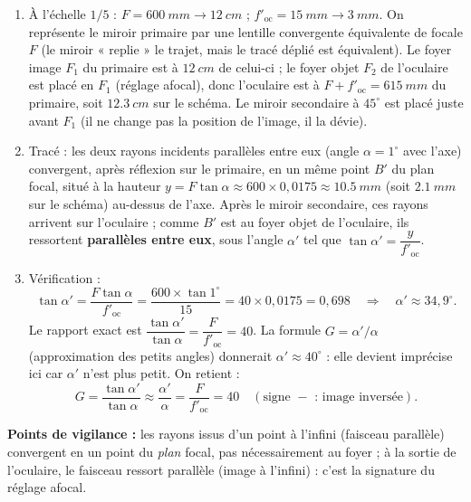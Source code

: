 \documentclass[11pt]{article}
\begin{document}
\begin{corrige}
\begin{enumerate}
    \item À l'échelle $1/5$ : $F = \SI{600}{mm} \rightarrow \SI{12}{cm}$ ; $f'_{\text{oc}} = \SI{15}{mm} \rightarrow \SI{3}{mm}$. On représente le miroir primaire par une lentille convergente équivalente de focale $F$ (le miroir « replie » le trajet, mais le tracé déplié est équivalent). Le foyer image $F_1$ du primaire est à $\SI{12}{cm}$ de celui-ci ; le foyer objet $F_2$ de l'oculaire est placé en $F_1$ (réglage afocal), donc l'oculaire est à $F + f'_{\text{oc}} = \SI{615}{mm}$ du primaire, soit $\SI{12,3}{cm}$ sur le schéma. Le miroir secondaire à $45^\circ$ est placé juste avant $F_1$ (il ne change pas la position de l'image, il la dévie).
    \item Tracé : les deux rayons incidents parallèles entre eux (angle $\alpha = 1^\circ$ avec l'axe) convergent, après réflexion sur le primaire, en un même point $B'$ du plan focal, situé à la hauteur $y = F\tan\alpha \approx 600 \times 0,0175 \approx \SI{10,5}{mm}$ (soit $\SI{2,1}{mm}$ sur le schéma) au-dessus de l'axe. Après le miroir secondaire, ces rayons arrivent sur l'oculaire ; comme $B'$ est au foyer objet de l'oculaire, ils ressortent \textbf{parallèles entre eux}, sous l'angle $\alpha'$ tel que $\tan\alpha' = \dfrac{y}{f'_{\text{oc}}}$.
    \item Vérification :
    \[ \tan\alpha' = \frac{F\tan\alpha}{f'_{\text{oc}}} = \frac{600 \times \tan 1^\circ}{15} = 40 \times 0,0175 = 0,698 \quad\Rightarrow\quad \alpha' \approx 34,9^\circ. \]
    Le rapport exact est $\dfrac{\tan\alpha'}{\tan\alpha} = \dfrac{F}{f'_{\text{oc}}} = 40$. La formule $G = \alpha'/\alpha$ (approximation des petits angles) donnerait $\alpha' \approx 40^\circ$ : elle devient imprécise ici car $\alpha'$ n'est plus petit. On retient :
    \[ G = \frac{\tan\alpha'}{\tan\alpha} \approx \frac{\alpha'}{\alpha} = \frac{F}{f'_{\text{oc}}} = 40 \quad (\text{signe } - \text{ : image inversée}). \]
\end{enumerate}
\textbf{Points de vigilance :} les rayons issus d'un point à l'infini (faisceau parallèle) convergent en un point du \emph{plan} focal, pas nécessairement au foyer ; à la sortie de l'oculaire, le faisceau ressort parallèle (image à l'infini) : c'est la signature du réglage afocal.
\end{corrige}
\end{document}
